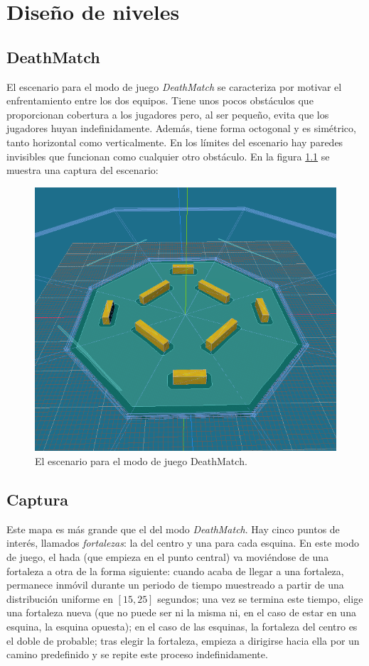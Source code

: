 \chapter{Diseño de niveles}


\section{DeathMatch}
El escenario para el modo de juego \emph{DeathMatch} se caracteriza por motivar el enfrentamiento entre los dos equipos. Tiene unos pocos obstáculos que proporcionan cobertura a los jugadores pero, al ser pequeño, evita que los jugadores huyan indefinidamente. Además, tiene forma octogonal y es simétrico, tanto horizontal como verticalmente. En los límites del escenario hay paredes invisibles que funcionan como cualquier otro obstáculo. En la figura \ref{fig:DeathMatchStage} se muestra una captura del escenario:

\begin{figure}[h]
	\centering
	\includegraphics[width=0.8\linewidth]{figures/DeathMatchStage.png}
	\caption{El escenario para el modo de juego DeathMatch.}
	\label{fig:DeathMatchStage}
\end{figure}

\section{Captura}
Este mapa es más grande que el del modo \emph{DeathMatch}. Hay cinco puntos de interés, llamados \emph{fortalezas}: la del centro y una para cada esquina. En este modo de juego, el hada (que empieza en el punto central) va moviéndose de una fortaleza a otra de la forma siguiente: cuando acaba de llegar a una fortaleza, permanece inmóvil durante un periodo de tiempo muestreado a partir de una distribución uniforme en $[15, 25]$ segundos; una vez se termina este tiempo, elige una fortaleza nueva (que no puede ser ni la misma ni, en el caso de estar en una esquina, la esquina opuesta); en el caso de las esquinas, la fortaleza del centro es el doble de probable; tras elegir la fortaleza, empieza a dirigirse hacia ella por un camino predefinido y se repite este proceso indefinidamente. 

